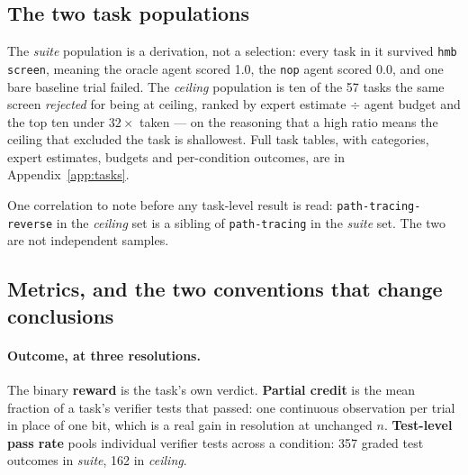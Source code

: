 \documentclass[11pt,a4paper]{article}
\newcommand{\code}[1]{\texttt{\small #1}}
\newcommand{\task}[1]{\texttt{\footnotesize #1}}
\begin{document}
\subsection{The two task populations}

\begin{table}[htbp]
\centering
\caption{The two populations, selected on opposite criteria. The line that matters is the
last but one: in both runs, most of the money bought tasks on which every condition did the
same thing.}
\label{tab:populations}
\small

\end{table}

The \emph{suite} population is a derivation, not a selection: every task in it survived
\code{hmb screen}, meaning the oracle agent scored 1.0, the \code{nop} agent scored 0.0, and
one bare baseline trial failed. The \emph{ceiling} population is ten of the 57 tasks the same
screen \emph{rejected} for being at ceiling, ranked by expert estimate $\div$ agent budget
and the top ten under $32\times$ taken --- on the reasoning that a high ratio means the
ceiling that excluded the task is shallowest. Full task tables, with categories, expert
estimates, budgets and per-condition outcomes, are in Appendix~\ref{app:tasks}.

One correlation to note before any task-level result is read: \task{path-tracing-reverse} in
the \emph{ceiling} set is a sibling of \task{path-tracing} in the \emph{suite} set. The two
are not independent samples.

\subsection{Metrics, and the two conventions that change conclusions}
\label{sec:metrics}

\paragraph{Outcome, at three resolutions.} The binary \textbf{reward} is the task's own
verdict. \textbf{Partial credit} is the mean fraction of a task's verifier tests that passed:
one continuous observation per trial in place of one bit, which is a real gain in resolution
at unchanged $n$. \textbf{Test-level pass rate} pools individual verifier tests across a
condition: 357 graded test outcomes in \emph{suite}, 162 in \emph{ceiling}.
\end{document}
